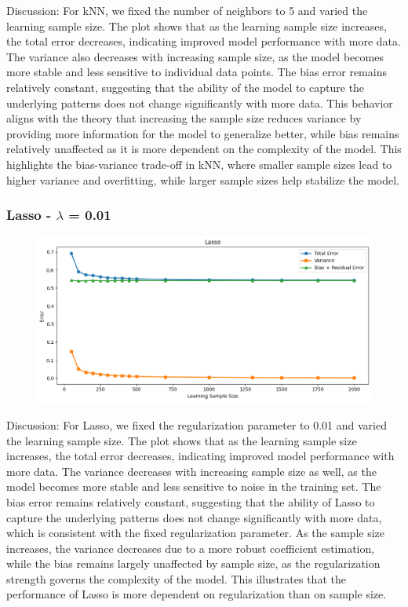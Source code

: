 \documentclass[a4paper,10pt]{article}
\begin{document}
Discussion:  
For kNN, we fixed the number of neighbors to 5 and varied the learning sample size. The plot shows that as the learning sample size increases, the total error decreases, indicating improved model performance with more data. The variance also decreases with increasing sample size, as the model becomes more stable and less sensitive to individual data points. The bias error remains relatively constant, suggesting that the ability of the model to capture the underlying patterns does not change significantly with more data. This behavior aligns with the theory that increasing the sample size reduces variance by providing more information for the model to generalize better, while bias remains relatively unaffected as it is more dependent on the complexity of the model. This highlights the bias-variance trade-off in kNN, where smaller sample sizes lead to higher variance and overfitting, while larger sample sizes help stabilize the model.

\subsubsection{Lasso - $\lambda$ = 0.01 }

\begin{figure}[H]
    \centering
    \includegraphics[width=1\linewidth]{zeazdca.png}
\end{figure}

Discussion:  
For Lasso, we fixed the regularization parameter to 0.01 and varied the learning sample size. The plot shows that as the learning sample size increases, the total error decreases, indicating improved model performance with more data. The variance decreases with increasing sample size as well, as the model becomes more stable and less sensitive to noise in the training set. The bias error remains relatively constant, suggesting that the ability of Lasso to capture the underlying patterns does not change significantly with more data, which is consistent with the fixed regularization parameter. As the sample size increases, the variance decreases due to a more robust coefficient estimation, while the bias remains largely unaffected by sample size, as the regularization strength governs the complexity of the model. This illustrates that the performance of Lasso is more dependent on regularization than on sample size.
\end{document}
